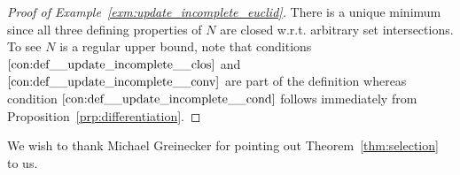 \begin{proof}[Proof of Example~\ref{exm:update_incomplete_euclid}]
There is a unique minimum since all three defining properties of $N$ are closed w.r.t. arbitrary set intersections. To see $N$ is a regular upper bound, note that conditions $\ref{con:def__update_incomplete__clos}$ and $\ref{con:def__update_incomplete__conv}$ are part of the definition whereas condition $\ref{con:def__update_incomplete__cond}$ follows immediately from Proposition~\ref{prp:differentiation}.
\end{proof}

\begin{acknowledgements}
We wish to thank Michael Greinecker for pointing out Theorem~\ref{thm:selection} to us.
\end{acknowledgements}




